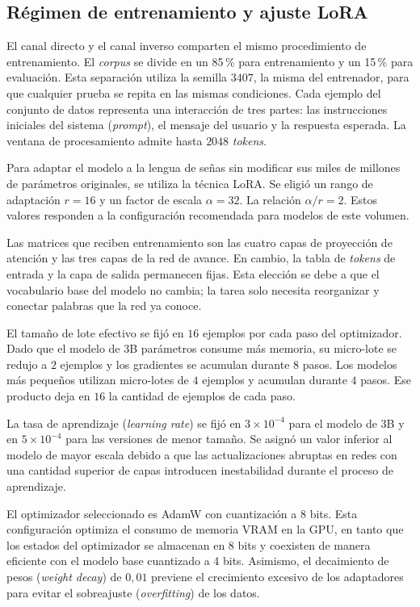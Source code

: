 \subsection{Régimen de entrenamiento y ajuste LoRA}
El canal directo y el canal inverso comparten el mismo procedimiento de entrenamiento. El \textit{corpus} se divide en un 85\,\% para entrenamiento y un 15\,\% para evaluación. Esta separación utiliza la semilla $3407$, la misma del entrenador, para que cualquier prueba se repita en las mismas condiciones. Cada ejemplo del conjunto de datos representa una interacción de tres partes: las instrucciones iniciales del sistema (\textit{prompt}), el mensaje del usuario y la respuesta esperada. La ventana de procesamiento admite hasta $2048$ \textit{tokens}.

Para adaptar el modelo a la lengua de señas sin modificar sus miles de millones de parámetros originales, se utiliza la técnica LoRA. Se eligió un rango de adaptación $r = 16$ y un factor de escala $\alpha = 32$. La relación $\alpha / r = 2$. Estos valores responden a la configuración recomendada para modelos de este volumen.

Las matrices que reciben entrenamiento son las cuatro capas de proyección de atención y las tres capas de la red de avance. En cambio, la tabla de \textit{tokens} de entrada y la capa de salida permanecen fijas. Esta elección se debe a que el vocabulario base del modelo no cambia; la tarea solo necesita reorganizar y conectar palabras que la red ya conoce.

El tamaño de lote efectivo se fijó en $16$ ejemplos por cada paso del optimizador. Dado que el modelo de 3B parámetros consume más memoria, su micro-lote se redujo a $2$ ejemplos y los gradientes se acumulan durante $8$ pasos. Los modelos más pequeños utilizan micro-lotes de $4$ ejemplos y acumulan durante $4$ pasos. Ese producto deja en $16$ la cantidad de ejemplos de cada paso.

La tasa de aprendizaje (\textit{learning rate}) se fijó en $3 \times 10^{-4}$ para el modelo de 3B y en $5 \times 10^{-4}$ para las versiones de menor tamaño. Se asignó un valor inferior al modelo de mayor escala debido a que las actualizaciones abruptas en redes con una cantidad superior de capas introducen inestabilidad durante el proceso de aprendizaje. 

El optimizador seleccionado es AdamW con cuantización a 8 bits. Esta configuración optimiza el consumo de memoria VRAM en la GPU, en tanto que los estados del optimizador se almacenan en 8 bits y coexisten de manera eficiente con el modelo base cuantizado a 4 bits. Asimismo, el decaimiento de pesos (\textit{weight decay}) de $0{,}01$ previene el crecimiento excesivo de los adaptadores para evitar el sobreajuste (\textit{overfitting}) de los datos. 

